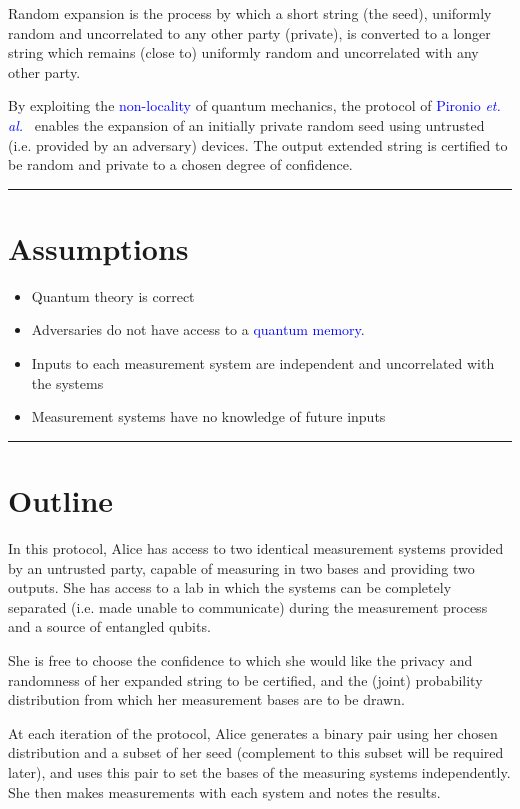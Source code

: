 \documentclass[12pt,letterpaper]{article}
\begin{document}
Random expansion is the process by which a short string (the seed), uniformly random and uncorrelated to any other party (private), is converted to a longer string which remains (close to) uniformly random and uncorrelated with any other party.

By exploiting the \textcolor{blue}{non-locality} of quantum mechanics, the protocol of \textcolor{blue}{Pironio \emph{et. al.}~\cite{pironio2010random}} enables the expansion of an initially private random seed using untrusted (i.e. provided by an adversary) devices. The output extended string is certified to be random and private to a chosen degree of confidence.

\rule{\textwidth}{2pt}
\section*{Assumptions}
\begin{itemize}[noitemsep]
    \item Quantum theory is correct
    \item Adversaries do not have access to a \textcolor{blue}{quantum memory}. 
    \item Inputs to each measurement system are independent and uncorrelated with the systems
    \item Measurement systems have no knowledge of future inputs
\end{itemize}

\rule{\textwidth}{2pt}
\section*{Outline}

In this protocol, Alice has access to two identical measurement systems provided by an untrusted party, capable of measuring in two bases and providing two outputs. She has access to a lab in which the systems can be completely separated (i.e. made unable to communicate) during the measurement process and a source of entangled qubits.

She is free to choose the confidence to which she would like the privacy and randomness of her expanded string to be certified, and the (joint) probability distribution from which her measurement bases are to be drawn. 

At each iteration of the protocol, Alice generates a binary pair using her chosen distribution and a subset of her seed (complement to this subset will be required later), and uses this pair to set the bases of the measuring systems independently. She then makes measurements with each system and notes the results. 
\end{document}
